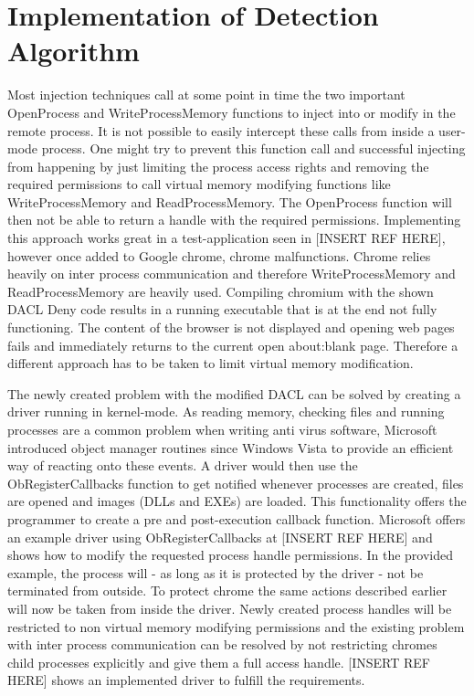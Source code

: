\section{Implementation of Detection Algorithm}
Most injection techniques call at some point in time the two important OpenProcess and WriteProcessMemory functions to inject into or modify in the remote process. It is not possible to easily intercept these calls from inside a user-mode process. One might try to prevent this function call and successful injecting from happening by just limiting the process access rights and removing the required permissions to call virtual memory modifying functions like WriteProcessMemory and ReadProcessMemory. The OpenProcess function will then not be able to return a handle with the required permissions. Implementing this approach works great in a test-application seen in [INSERT REF HERE], however once added to Google chrome, chrome malfunctions. Chrome relies heavily on inter process communication and therefore WriteProcessMemory and ReadProcessMemory are heavily used. Compiling chromium with the shown DACL Deny code results in a running executable that is at the end not fully functioning. The content of the browser is not displayed and opening web pages fails and immediately returns to the current open about:blank page. Therefore a different approach has to be taken to limit virtual memory modification.

The newly created problem with the modified DACL can be solved by creating a driver running in kernel-mode. As reading memory, checking files and running processes are a common problem when writing anti virus software, Microsoft introduced object manager routines since Windows Vista to provide an efficient way of reacting onto these events. A driver would then use the ObRegisterCallbacks function to get notified whenever processes are created, files are opened and images (DLLs and EXEs) are loaded. This functionality offers the programmer to create a pre and post-execution callback function. Microsoft offers an example driver using ObRegisterCallbacks at [INSERT REF HERE] and shows how to modify the requested process handle permissions. In the provided example, the process will - as long as it is protected by the driver - not be terminated from outside. To protect chrome the same actions described earlier will now be taken from inside the driver. Newly created process handles will be restricted to non virtual memory modifying permissions and the existing problem with inter process communication can be resolved by not restricting chromes child processes explicitly and give them a full access handle. [INSERT REF HERE] shows an implemented driver to fulfill the requirements. 